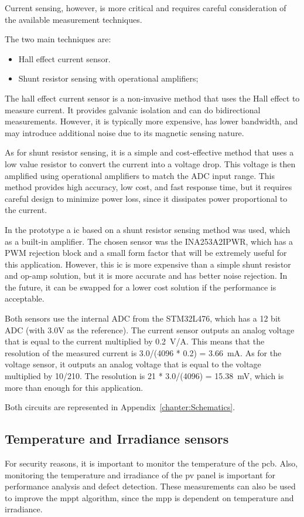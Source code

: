     Current sensing, however, is more critical and requires careful consideration of the available measurement techniques.

    The two main techniques are:
    \begin{itemize}[leftmargin=4em, itemsep=1pt, topsep=2pt]
        \item Hall effect current sensor.
        \item Shunt resistor sensing with operational amplifiers;
    \end{itemize}

    The hall effect current sensor is a non-invasive method that uses the Hall effect to measure current. It provides galvanic isolation and can do bidirectional measurements. However, it is typically more expensive, has lower bandwidth, and may introduce additional noise due to its magnetic sensing nature.

    As for shunt resistor sensing, it is a simple and cost-effective method that uses a low value resistor to convert the current into a voltage drop. This voltage is then amplified using operational amplifiers to match the ADC input range. This method provides high accuracy, low cost, and fast response time, but it requires careful design to minimize power loss, since it dissipates power proportional to the current.

    In the prototype a \ac{ic} based on a shunt resistor sensing method was used, which as a built-in amplifier. The chosen sensor was the INA253A2IPWR, which has a PWM rejection block and a small form factor that will be extremely useful for this application. However, this \ac{ic} is more expensive than a simple shunt resistor and op-amp solution, but it is more accurate and has better noise rejection. In the future, it can be swapped for a lower cost solution if the performance is acceptable.

    Both sensors use the internal ADC from the STM32L476, which has a 12 bit ADC (with 3.0V as the reference). The current sensor outputs an analog voltage that is equal to the current multiplied by 0.2~V/A. This means that the resolution of the measured current is 3.0/(4096 * 0.2) = 3.66~mA. As for the voltage sensor, it outputs an analog voltage that is equal to the voltage multiplied by 10/210. The resolution is 21 * 3.0/(4096) = 15.38~mV, which is more than enough for this application.

    Both circuits are represented in Appendix~\ref{chapter:Schematics}.

\subsection{Temperature and Irradiance sensors}
    For security reasons, it is important to monitor the temperature of the \ac{pcb}. Also, monitoring the temperature and irradiance of the \ac{pv} panel is important for performance analysis and defect detection. These measurements can also be used to improve the \ac{mppt} algorithm, since the \ac{mpp} is dependent on temperature and irradiance.

